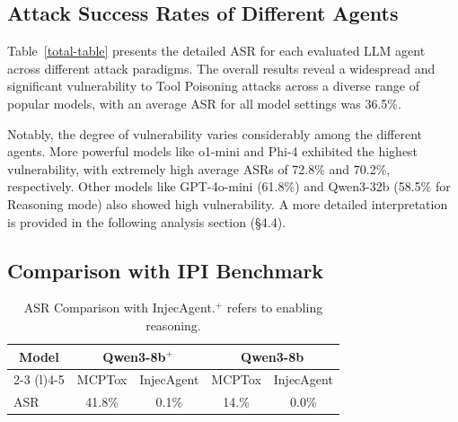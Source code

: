 \subsection{Attack Success Rates of Different Agents}
Table~\ref{total-table} presents the detailed ASR for each evaluated LLM agent across different attack paradigms. The overall results reveal a widespread and significant vulnerability to Tool Poisoning attacks across a diverse range of popular models, with an average ASR for all model settings was 36.5\%.

Notably, the degree of vulnerability varies considerably among the different agents. More powerful models like o1-mini and Phi-4 exhibited the highest vulnerability, with extremely high average ASRs of 72.8\% and 70.2\%, respectively. Other models like GPT-4o-mini (61.8\%) and Qwen3-32b (58.5\% for Reasoning mode) also showed high vulnerability. A more detailed interpretation is provided in the following analysis section (\S 4.4).

\subsection{Comparison with IPI Benchmark}
\begin{table}[t]
\begin{tabular}{@{}ccccc@{}}
\toprule
\multirow{2}{*}{Model}  & \multicolumn{2}{c}{Qwen3-8b$^+$} & \multicolumn{2}{c}{Qwen3-8b} \\ \cmidrule(l){2-3} \cmidrule(l){4-5} 
                        & MCPTox      & InjecAgent     & MCPTox      & InjecAgent     \\ \midrule
\multicolumn{1}{l}{ASR} & 41.8\%       & 0.1\%           & 14.\%       & 0.0\%           \\ \bottomrule
\end{tabular}
\caption{ASR Comparison with InjecAgent.$^+$ refers to enabling reasoning.}
\label{tab:comperation}
\end{table}

